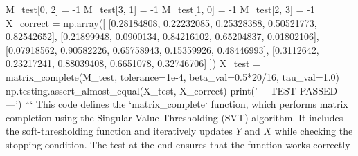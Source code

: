 M_test[0, 2] = -1
M_test[3, 1] = -1
M_test[1, 0] = -1
M_test[2, 3] = -1
X_correct = np.array([
[0.28184808, 0.22232085, 0.25328388, 0.50521773, 0.82542652],
[0.21899948, 0.0900134, 0.84216102, 0.65204837, 0.01802106],
[0.07918562, 0.90582226, 0.65758943, 0.15359926, 0.48446993],
[0.3112642, 0.23217241, 0.88039408, 0.6651078, 0.32746706]
])
X_test = matrix_complete(M_test, tolerance=1e-4, beta_val=0.5*20/16, tau_val=1.0)
np.testing.assert_almost_equal(X_test, X_correct)
print('--- TEST PASSED ---')
```
This code defines the `matrix_complete` function, which performs matrix completion using the Singular Value Thresholding (SVT) algorithm. It includes the soft-thresholding function and iteratively updates \( Y \) and \( X \) while checking the stopping condition. The test at the end ensures that the function works correctly












